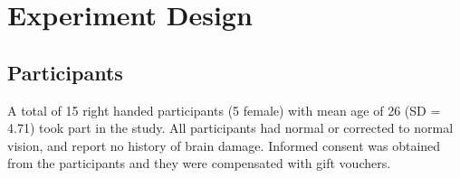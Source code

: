 \documentclass[../main/Feedback.tex]{subfiles}
\begin{document}
\section{Experiment Design}

\subsection{Participants}
A total of 15 right handed participants (5 female) with mean age of 26 (SD = 4.71) took part in the study. 
All participants had normal or corrected to normal vision, and report no history of brain damage. 
Informed consent was obtained from the participants and they were compensated with gift vouchers.
\end{document}
